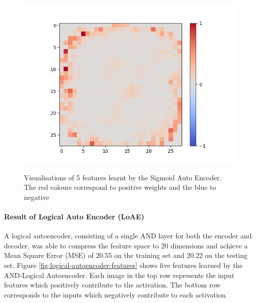 \begin{figure}[H]
\begin{minipage}[b]{0.19\textwidth}
		\includegraphics[width=\textwidth]{SAE(20LF)/Feature-15.png}
		\label{}
	\end{minipage}
	\caption{Visualisations of 5 features learnt by the Sigmoid Auto Encoder. The red colours correspond to positive weights and the blue to negative}
	\label{fig:sigmoid-autoencoder-features}
	\hfill
\end{figure}

\paragraph{Result of Logical Auto Encoder (LoAE)}
A logical autoencoder, consisting of a single AND layer for both the encoder and decoder, was able to compress the feature space to 20 dimensions and achieve a Mean Square Error (MSE) of 20.55 on the training set and 20.22 on the testing set. Figure \ref{fig:logical-autoencoder-features} shows five features learned by the AND-Logical Autoencoder. Each image in the top row represents the input features which positively contribute to the activation. The bottom row corresponds to the inputs which negatively contribute to each activation. 

